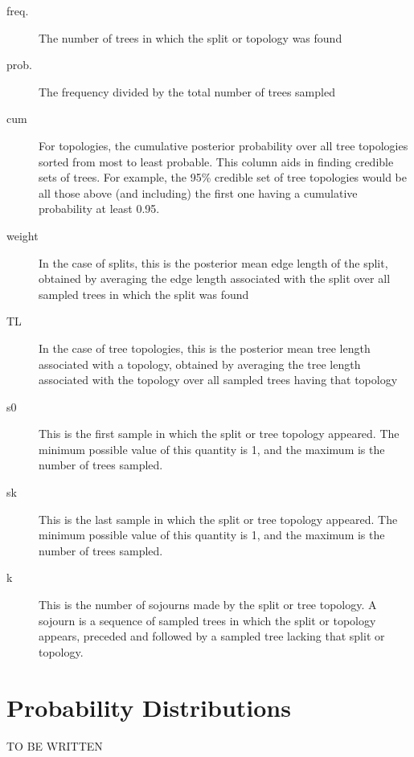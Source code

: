 \documentclass[10pt]{article}
\begin{document}
\begin{description}
\item[freq.] The number of trees in which the split or topology was found
\item[prob.] The frequency divided by the total number of trees sampled
\item[cum] For topologies, the cumulative posterior probability over all tree topologies sorted from most to least probable. This column aids in finding credible sets of trees. For example, the 95\% credible set of tree topologies would be all those above (and including) the first one having a cumulative probability at least 0.95.
\item[weight] In the case of splits, this is the posterior mean edge length of the split, obtained by averaging the edge length associated with the split over all sampled trees in which the split was found
\item[TL] In the case of tree topologies, this is the posterior mean tree length associated with a topology, obtained by averaging the tree length associated with the topology over all sampled trees having that topology
\item[s0] This is the first sample in which the split or tree topology appeared. The minimum possible value of this quantity is 1, and the maximum is the number of trees sampled.
\item[sk] This is the last sample in which the split or tree topology appeared. The minimum possible value of this quantity is 1, and the maximum is the number of trees sampled.
\item[k] This is the number of sojourns made by the split or tree topology. A sojourn is a sequence of sampled trees in which the split or topology appears, preceded and followed by a sampled tree lacking that split or topology.
\end{description}

\section{Probability Distributions}\label{sec:probdist}

TO BE WRITTEN

\end{document}

